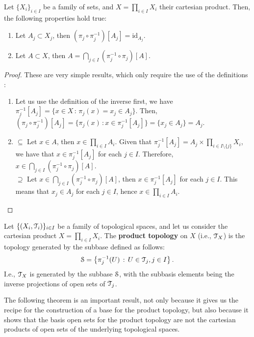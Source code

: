 \begin{lemma}
	\label{lem:projection}
	Let $\{X_i\}_{i\in I}$ be a family of sets, and $X=\prod_{i\in I} X_i$ their cartesian product.
	Then, the following properties hold true:
	\begin{enumerate}
		\item Let $A_j\subset X_j$, then $(\pi_j\circ\pi^{-1}_j)[A_j] = \text{id}_{A_j}$.
		\item Let $A\subset X$, then $A = \bigcap_{j\in I}(\pi_j^{-1}\circ\pi_j)[A]$.
	\end{enumerate}
\end{lemma}
\begin{proof}These are very simple results, which only require the use of the definitions :
	\begin{enumerate}
		\item Let us use the definition of the inverse first, we have $\pi_{j}^{-1}[A_j]=\{ x\in X\,:\,\pi_{j}(x)=x_j\in A_j\}$.
		Then, $(\pi_{j}\circ\pi_{j}^{-1})[A_j]=\{\pi_{j}(x)\,: x\in \pi_{j}^{-1}[A_j]\}=\{x_j\in A_j\} = A_j$.
		\item {$\boxed{\subseteq}$} Let $x\in A$, then $x\in \prod_{i\in I} A_i$. Given that $\pi_j^{-1}[A_j] = A_j\times\prod_{i\in I\setminus\{j\}}X_i$,
		we have that $x\in \pi_j^{-1}[A_j]$ for each $j\in I$. Therefore, $x\in \bigcap_{j\in I}(\pi_j^{-1}\circ\pi_j)[A]$.\\
		{$\boxed{\supseteq}$} Let $x \in \bigcap_{j\in I}(\pi_j^{-1}\circ\pi_j)[A]$, then $x\in \pi_j^{-1}[A_j]$ for each $j\in I$.
		This means that $x_j \in A_j$ for each $j\in I$, hence $x\in \prod_{i\in I} A_i$.
	\end{enumerate}
\end{proof}

\begin{definition}
	\label{def:product-topology}
	Let $\{(X_i, \T_i)\}_{i\in I}$ be a family of topological spaces, and
	let us consider the cartesian product $X=\prod_{i\in I} X_i$.
	The \textbf{product topology} on $X$ (i.e., $\T_{X}$) is the topology generated by the subbase
	defined as follows:
	$$
		\S = \setdef{\pi^{-1}_j(U)}{U\in\T_j, j\in I}.
	$$
	I.e., $\T_X$ is generated by the subbase $\S$, with the subbasis elements
	being the inverse projections of open sets of $\T_j$.
\end{definition}

The following theorem is an important result, not only because it gives us the recipe
for the construction of a base for the product topology, but also because it shows that
the basis open sets for the product topology are not the cartesian products of open sets
of the underlying topological spaces.

